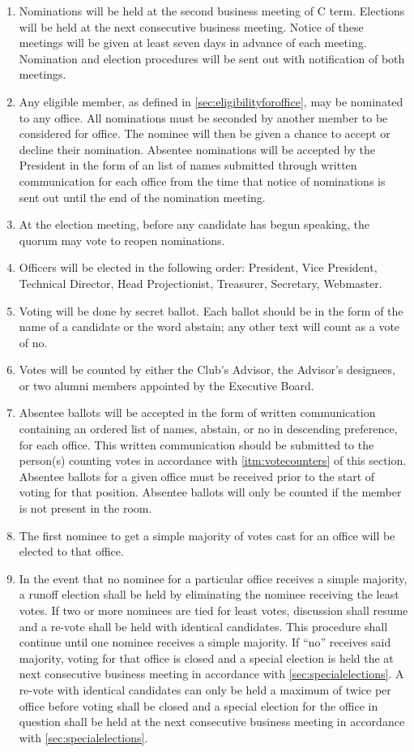 \documentclass[12pt,letterpaper,oneside]{book}
\begin{document}
\begin{enumerate}

\item Nominations will be held at the second business meeting of C term. Elections will be held at the next consecutive business meeting. Notice of these meetings will be given at least seven days in advance of each meeting. Nomination and election procedures will be sent out with notification of both meetings.
\item Any eligible member, as defined in \cref{sec:eligibilityforoffice}, may be nominated to any office. All nominations must be seconded by another member to be considered for office. The nominee will then be given a chance to accept or decline their nomination. Absentee nominations will be accepted by the President in the form of an list of names submitted through written communication for each office from the time that notice of nominations is sent out until the end of the nomination meeting.
\item At the election meeting, before any candidate has begun speaking, the quorum may vote to reopen nominations.
\item Officers will be elected in the following order: President, Vice President, Technical Director, Head Projectionist, Treasurer, Secretary, Webmaster.
\item Voting will be done by secret ballot. Each ballot should be in the form of the name of a candidate or the word abstain; any other text will count as a vote of no.
\item \label{itm:votecounters} Votes will be counted by either the Club’s Advisor, the Advisor’s designees, or two alumni members appointed by the Executive Board.
\item Absentee ballots will be accepted in the form of written communication containing an ordered list of names, abstain, or no in descending preference, for each office. This written communication should be submitted to the person(s) counting votes in accordance with \cref{itm:votecounters} of this section. Absentee ballots for a given office must be received prior to the start of voting for that position. Absentee ballots will only be counted if the member is not present in the room.
\item The first nominee to get a simple majority of votes cast for an office will be elected to that office.
\item In the event that no nominee for a particular office receives a simple majority, a runoff election shall be held by eliminating the nominee receiving the least votes. If two or more nominees are tied for least votes, discussion shall resume and a re-vote shall be held with identical candidates. This procedure shall continue until one nominee receives a simple majority. If “no” receives said majority, voting for that office is closed and a special election is held the at next consecutive business meeting in accordance with \cref{sec:specialelections}. A re-vote with identical candidates can only be held a maximum of twice per office before voting shall be closed and a special election for the office in question shall be held at the next consecutive business meeting in accordance with \cref{sec:specialelections}.

\end{enumerate}
\end{document}
